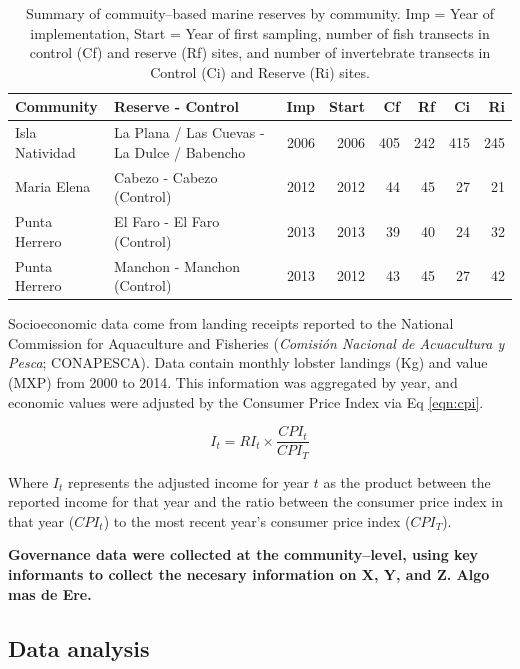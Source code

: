 \documentclass{frontiersSCNS}
\theoremstyle{definition}
\theoremstyle{definition}
\theoremstyle{definition}
\theoremstyle{remark}
\begin{document}
\begin{table}

\caption{\label{tab:unnamed-chunk-2}\label{tab:com_sum} Summary of commuity--based marine reserves by community. Imp = Year of implementation, Start = Year of first sampling, number of fish transects in control (Cf) and reserve (Rf) sites, and number of invertebrate transects in Control (Ci) and Reserve (Ri) sites.}
\centering
\begin{tabular}[t]{l|l|r|r|r|r|r|r}
\hline
Community & Reserve - Control & Imp & Start & Cf & Rf & Ci & Ri\\
\hline
Isla Natividad & La Plana / Las Cuevas - La Dulce / Babencho & 2006 & 2006 & 405 & 242 & 415 & 245\\
\hline
Maria Elena & Cabezo - Cabezo (Control) & 2012 & 2012 & 44 & 45 & 27 & 21\\
\hline
Punta Herrero & El Faro - El Faro (Control) & 2013 & 2013 & 39 & 40 & 24 & 32\\
\hline
Punta Herrero & Manchon - Manchon (Control) & 2013 & 2012 & 43 & 45 & 27 & 42\\
\hline
\end{tabular}
\end{table}

Socioeconomic data come from landing receipts reported to the National
Commission for Aquaculture and Fisheries (\emph{Comisión Nacional de
Acuacultura y Pesca}; CONAPESCA). Data contain monthly lobster landings
(Kg) and value (MXP) from 2000 to 2014. This information was aggregated
by year, and economic values were adjusted by the Consumer Price Index
\citep{oecd_2017-VV} via Eq \ref{eqn:cpi}.

\begin{equation}
I_t = RI_t\times\frac{CPI_t}{CPI_T}
\label{eqn:cpi}
\end{equation}

Where \(I_t\) represents the adjusted income for year \(t\) as the
product between the reported income for that year and the ratio between
the consumer price index in that year (\(CPI_t\)) to the most recent
year's consumer price index (\(CPI_T\)).

\textbf{Governance data were collected at the community--level, using
key informants to collect the necesary information on X, Y, and Z. Algo
mas de Ere.}

\subsection{Data analysis}\label{data-analysis}
\end{document}

